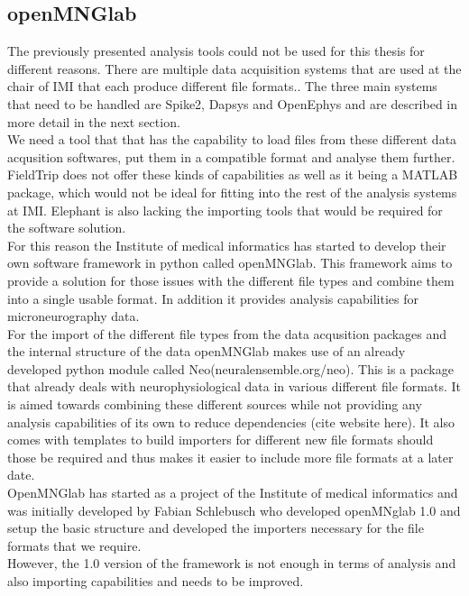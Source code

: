 \subsection{openMNGlab}
The previously presented analysis tools could not be used for this thesis for different reasons.
There are multiple data acquisition systems that are used at the chair of IMI that each produce different file formats.. The three main systems that need to be handled are Spike2, Dapsys and OpenEphys and are described in more detail in the next section. \\ 
We need a tool that that has the capability to load files from these different data acqusition softwares, put them in a compatible format and analyse them further.  FieldTrip does not offer these kinds of capabilities as well as it being a MATLAB package, which would not be ideal for fitting into the rest of the analysis systems at IMI. Elephant is also lacking the importing tools that would be required for the software solution.  \\
For this reason the Institute of medical informatics has started to develop their own software framework in python called openMNGlab.  This framework aims to provide a solution for those issues with the different file types and combine them into a single usable format.  In addition it provides analysis capabilities for microneurography data. \\
For the import of the different file types from the data acqusition packages and the internal structure of the data openMNGlab makes use of an already developed python module called Neo(neuralensemble.org/neo). This is a package that already deals with neurophysiological data in various different file formats. It is aimed towards combining these different sources while not providing any analysis capabilities of its own to reduce dependencies (cite website here). It also comes with templates to build importers for different new file formats should those be required and thus makes it easier to include more file formats at a later date.\\
OpenMNGlab has started as a project of the Institute of medical informatics and was initially developed by Fabian Schlebusch who developed openMNglab 1.0 and setup the basic structure and developed the importers necessary for the file formats that we require. \\
However, the 1.0 version of the framework is not enough in terms of analysis and also importing capabilities and needs to be improved. 

